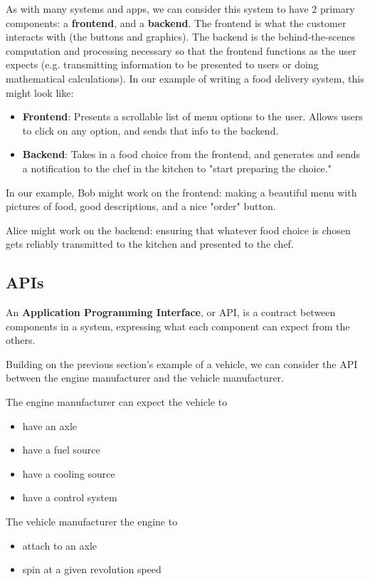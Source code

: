 As with many systems and apps, we can consider this system to have 2 primary components: a \textbf{frontend}, and a \textbf{backend}. The frontend is what the customer interacts with (the buttons and graphics). The backend is the behind-the-scenes computation and processing necessary so that the frontend functions as the user expects (e.g. transmitting information to be presented to users or doing mathematical calculations). In our example of writing a food delivery system, this might look like:
\begin{itemize}
	\item \textbf{Frontend}: Presents a scrollable list of menu options to the user. Allows users to click on any option, and sends that info to the backend. 
	\item \textbf{Backend}: Takes in a food choice from the frontend, and generates and sends a notification to the chef in the kitchen to "start preparing the choice." 
\end{itemize}

In our example, Bob might work on the frontend: making a beautiful menu with pictures of food, good descriptions, and a nice "order" button. 

Alice might work on the backend: ensuring that whatever food choice is chosen gets reliably transmitted to the kitchen and presented to the chef. 

\subsection{APIs}
\begin{definition}
An \textbf{Application Programming Interface}, or API, is a contract between components in a system, expressing what each component can expect from the others. 
\end{definition}

Building on the previous section's example of a vehicle, we can consider the API between the engine manufacturer and the vehicle manufacturer. 

The engine manufacturer can expect the vehicle to
\begin{itemize}
	\item have an axle 
	\item have a fuel source
	\item have a cooling source
	\item have a control system
\end{itemize}

The vehicle manufacturer the engine to
\begin{itemize}
	\item attach to an axle
	\item spin at a given revolution speed
\end{itemize}

